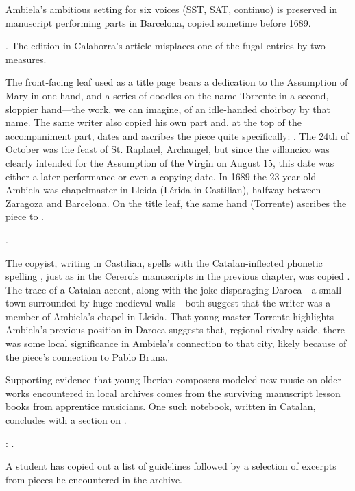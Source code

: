 Ambiela's ambitious setting for six voices (SST, SAT, continuo) is preserved in
manuscript performing parts in Barcelona, copied sometime before 1689.%
\begin{Footnote}
    .
    The edition in Calahorra's article misplaces one of the fugal entries by
    two measures. 
\end{Footnote}
The front-facing leaf used as a title page bears a dedication to the Assumption
of Mary in one hand, and a series of doodles on the name Torrente in a second,
sloppier hand---the work, we can imagine, of an idle-handed choirboy by that
name.
The same writer also copied his own  part and, at the top of the
accompaniment part, dates and ascribes the piece quite specifically:
.
The 24th of October was the feast of St. Raphael, Archangel, but since the
villancico was clearly intended for the Assumption of the Virgin on August 15,
this date was either a later performance or even a copying date.
In 1689 the 23-year-old Ambiela was chapelmaster in Lleida (Lérida in
Castilian), halfway between Zaragoza and Barcelona.
On the title leaf, the same hand (Torrente) ascribes the piece to
.%
\begin{Footnote}
    .
\end{Footnote}
The copyist, writing in Castilian, spells  with the
Catalan-inflected phonetic spelling ,
just as in the Cererols manuscripts in the previous chapter,
 was copied .  
The trace of a Catalan accent, along with the joke disparaging Daroca---a small
town surrounded by huge medieval walls---both suggest that the writer was a
member of Ambiela's chapel in Lleida.
That young master Torrente highlights Ambiela's previous position in Daroca
suggests that, regional rivalry aside, there was some local significance in
Ambiela's connection to that city, likely because of the piece's connection to
Pablo Bruna.

Supporting evidence that young Iberian composers modeled new music on older
works encountered in local archives comes from the surviving manuscript lesson
books from apprentice musicians.
One such notebook, written in Catalan, concludes with a section on .%
\begin{Footnote}
    : .
\end{Footnote}
A student has copied out a list of guidelines followed by a selection of
excerpts from pieces he encountered in the archive.

